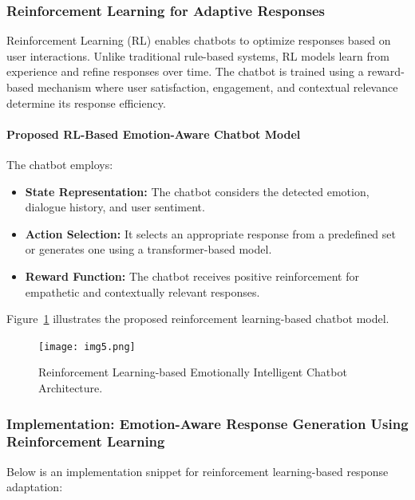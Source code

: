 \documentclass[a4paper,10pt]{article}
\begin{document}
\subsubsection{Reinforcement Learning for Adaptive Responses}
Reinforcement Learning (RL) enables chatbots to optimize responses based on user interactions. Unlike traditional rule-based systems, RL models learn from experience and refine responses over time. The chatbot is trained using a reward-based mechanism where user satisfaction, engagement, and contextual relevance determine its response efficiency.

\paragraph{Proposed RL-Based Emotion-Aware Chatbot Model}
The chatbot employs:
\begin{itemize}
    \item \textbf{State Representation:} The chatbot considers the detected emotion, dialogue history, and user sentiment.
    \item \textbf{Action Selection:} It selects an appropriate response from a predefined set or generates one using a transformer-based model.
    \item \textbf{Reward Function:} The chatbot receives positive reinforcement for empathetic and contextually relevant responses.
\end{itemize}

Figure~\ref{fig:rl_chatbot_architecture} illustrates the proposed reinforcement learning-based chatbot model.

\begin{figure}[h]
    \centering
    \texttt{[image: img5.png]}
    \caption{Reinforcement Learning-based Emotionally Intelligent Chatbot Architecture.}
    \label{fig:rl_chatbot_architecture}
\end{figure}

\subsubsection{Implementation: Emotion-Aware Response Generation Using Reinforcement Learning}
Below is an implementation snippet for reinforcement learning-based response adaptation:
\end{document}
